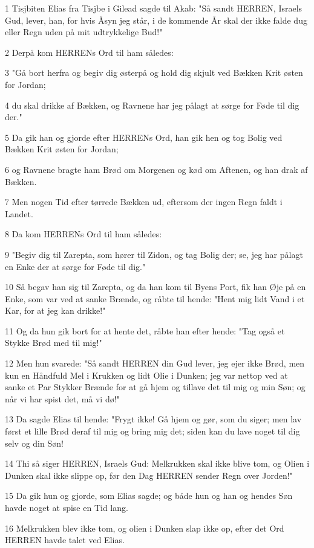 \par 1 Tisjbiten Elias fra Tisjbe i Gilead sagde til Akab: "Så sandt HERREN, Israels Gud, lever, han, for hvis Åsyn jeg står, i de kommende År skal der ikke falde dug eller Regn uden på mit udtrykkelige Bud!"
\par 2 Derpå kom HERRENs Ord til ham således:
\par 3 "Gå bort herfra og begiv dig østerpå og hold dig skjult ved Bækken Krit østen for Jordan;
\par 4 du skal drikke af Bækken, og Ravnene har jeg pålagt at sørge for Føde til dig der."
\par 5 Da gik han og gjorde efter HERRENs Ord, han gik hen og tog Bolig ved Bækken Krit østen for Jordan;
\par 6 og Ravnene bragte ham Brød om Morgenen og kød om Aftenen, og han drak af Bækken.
\par 7 Men nogen Tid efter tørrede Bækken ud, eftersom der ingen Regn faldt i Landet.
\par 8 Da kom HERRENs Ord til ham således:
\par 9 "Begiv dig til Zarepta, som hører til Zidon, og tag Bolig der; se, jeg har pålagt en Enke der at sørge for Føde til dig."
\par 10 Så begav han sig til Zarepta, og da han kom til Byens Port, fik han Øje på en Enke, som var ved at sanke Brænde, og råbte til hende: "Hent mig lidt Vand i et Kar, for at jeg kan drikke!"
\par 11 Og da hun gik bort for at hente det, råbte han efter hende: "Tag også et Stykke Brød med til mig!"
\par 12 Men hun svarede: "Så sandt HERREN din Gud lever, jeg ejer ikke Brød, men kun en Håndfuld Mel i Krukken og lidt Olie i Dunken; jeg var nettop ved at sanke et Par Stykker Brænde for at gå hjem og tillave det til mig og min Søn; og når vi har spist det, må vi dø!"
\par 13 Da sagde Elias til hende: "Frygt ikke! Gå hjem og gør, som du siger; men lav først et lille Brød deraf til mig og bring mig det; siden kan du lave noget til dig selv og din Søn!
\par 14 Thi så siger HERREN, Israels Gud: Melkrukken skal ikke blive tom, og Olien i Dunken skal ikke slippe op, før den Dag HERREN sender Regn over Jorden!"
\par 15 Da gik hun og gjorde, som Elias sagde; og både hun og han og hendes Søn havde noget at spise en Tid lang.
\par 16 Melkrukken blev ikke tom, og olien i Dunken slap ikke op, efter det Ord HERREN havde talet ved Elias.
